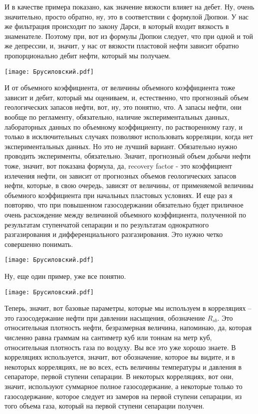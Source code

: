 \documentclass[main.tex]{subfiles}
\begin{document}
И в качестве примера показано, как значение вязкости влияет на дебет.
Ну, очень значительно, просто обратно, ну, это в соответствии с формулой Дюпюи.
У нас же фильтрация происходит по закону Дарси, в который входит вязкость в знаменателе.
Поэтому при, вот из формулы Дюпюи следует, что при одной и той же депрессии, и, значит, у нас от вязкости пластовой нефти зависит обратно пропорционально дебит нефти, который мы получаем.

\begin{center}
\texttt{[image: Брусиловский.pdf]}
\end{center}

И от объемного коэффициента, от величины объемного коэффициента тоже зависит и дебит, который мы оцениваем, и, естественно, что прогнозный объем геологических запасов нефти, вот, ну, это понятно, что.
А запасы нефти, они вообще по регламенту, обязательно, наличие экспериментальных данных, лабораторных данных по объемному коэффициенту, по растворенному газу, и только в исключительных случаях позволяют использовать корреляции, когда нет экспериментальных данных.
Но это не лучший вариант.
Обязательно нужно проводить эксперименты, обязательно.
Значит, прогнозный объем добычи нефти тоже, значит, вот показана формула, да, recovery factor - это коэффициент излечения нефти, он зависит от прогнозных объемов геологических запасов нефти,
которые, в свою очередь, зависят от величины, от применяемой величины объемного коэффициента при начальных пластовых условиях.
И еще раз я повторяю, что при повышенном газосодержании обязательно будет приличное очень расхождение между величиной объемного коэффициента, полученной по результатам ступенчатой сепарации и по результатам однократного разгазирования и дифференциального разгазирования.
Это нужно четко совершенно понимать.

\begin{center}
\texttt{[image: Брусиловский.pdf]}
\end{center}

Ну, еще один пример, уже все понятно.

\begin{center}
\texttt{[image: Брусиловский.pdf]}
\end{center}

Теперь, значит, вот базовые параметры, которые мы используем в корреляциях -- это газосодержание нефти при давлении насыщения, обозначение $R_{sb}$.
Это относительная плотность нефти, безразмерная величина, напоминаю, да, которая численно равна граммам на сантиметр куб или тоннам на метр куб, относительная плотность газа по воздуху.
Вы все это уже хорошо знаете.
В корреляциях используется, значит, вот обозначение, которое вы видите, и в некоторых корреляциях, не во всех, есть величины температуры и давления в сепараторе, первой ступени сепарации.
В некоторых корреляциях, вот они, значит, используют суммарное полное газосодержание, а некоторые только то газосодержание, которое следует из замеров на первой ступени сепарации, из того объема газа, который на первой ступени сепарации получен.
\end{document}
